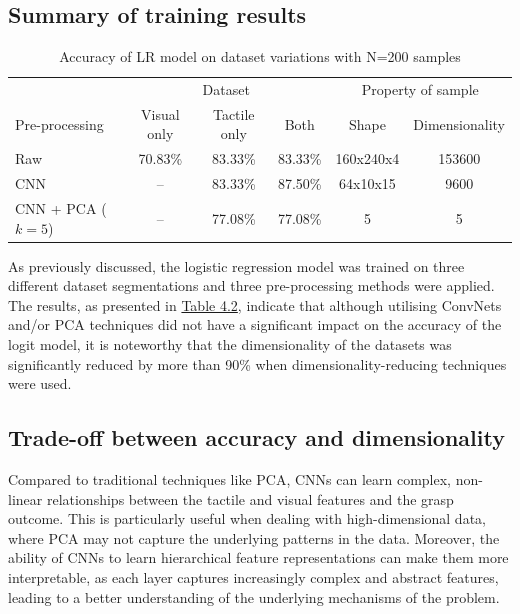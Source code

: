 \documentclass[11pt, a4paper]{report}
\begin{document}
\subsection{Summary of training results}\label{sec:4.5.1}
\label{sec:4.5.1}
\begin{table}[H]
    \centering
    \small
    \begin{tabular}{lccccc}
        \toprule
        & \multicolumn{3}{c}{Dataset} & \multicolumn{2}{c}{Property of sample} \\
        \cmidrule{2-4}\cmidrule{5-6}
        Pre-processing & Visual only & Tactile only & Both & Shape & Dimensionality \\
        \midrule
        Raw & 70.83\% & 83.33\% & 83.33\% & 160x240x4 & 153600 \\
        CNN & -- & 83.33\% & 87.50\% & 64x10x15  & 9600 \\
        CNN + PCA ($k=5$) & -- & 77.08\% & 77.08\% & 5 & 5\\
        \bottomrule
    \end{tabular}
    \caption{Accuracy of LR model on dataset variations with N=200 samples}
    \label{tbl:4.2}
\end{table}
As previously discussed, the logistic regression model was trained on three different dataset segmentations and three pre-processing methods were applied. The results, as presented in \hyperref[tbl:4.2]{Table 4.2}, indicate that although utilising ConvNets and/or PCA techniques did not have a significant impact on the accuracy of the logit model, it is noteworthy that the dimensionality of the datasets was significantly reduced by more than 90\% when dimensionality-reducing techniques were used.


\subsection{Trade-off between accuracy and dimensionality}\label{sec:4.5.2}
Compared to traditional techniques like PCA, CNNs can learn complex, non-linear relationships between the tactile and visual features and the grasp outcome. This is particularly useful when dealing with high-dimensional data, where PCA may not capture the underlying patterns in the data. Moreover, the ability of CNNs to learn hierarchical feature representations can make them more interpretable, as each layer captures increasingly complex and abstract features, leading to a better understanding of the underlying mechanisms of the problem.
\end{document}

